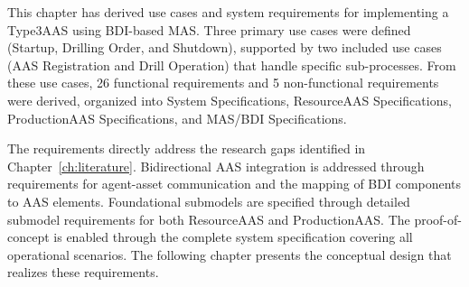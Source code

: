 This chapter has derived use cases and system requirements for implementing a \ac{Type3AAS} using \ac{BDI}-based \ac{MAS}. Three primary use cases were defined (Startup, Drilling Order, and Shutdown), supported by two included use cases (AAS Registration and Drill Operation) that handle specific sub-processes. From these use cases, 26 functional requirements and 5 non-functional requirements were derived, organized into System Specifications, ResourceAAS Specifications, ProductionAAS Specifications, and MAS/BDI Specifications.

The requirements directly address the research gaps identified in Chapter~\ref{ch:literature}. Bidirectional \ac{AAS} integration is addressed through requirements for agent-asset communication and the mapping of \ac{BDI} components to \ac{AAS} elements. Foundational submodels are specified through detailed submodel requirements for both ResourceAAS and ProductionAAS. The proof-of-concept is enabled through the complete system specification covering all operational scenarios. The following chapter presents the conceptual design that realizes these requirements.